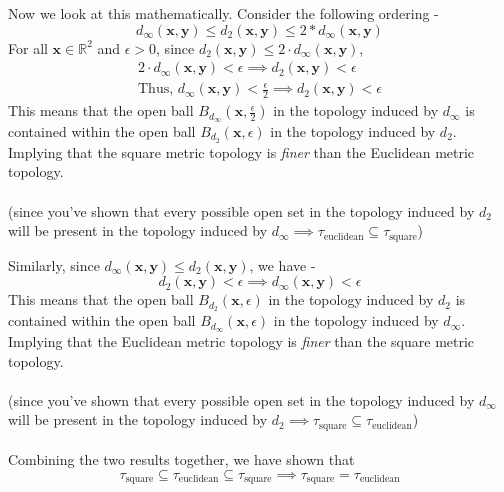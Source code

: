 \begin{frame}
    Now we look at this mathematically. Consider the following ordering -
    \begin{equation*}
        d_\infty(\boldsymbol{x}, \boldsymbol{y}) \leq d_2(\boldsymbol{x}, \boldsymbol{y}) \leq 2*d_\infty(\boldsymbol{x}, \boldsymbol{y})
    \end{equation*}
    \pause
    For all $\boldsymbol{x} \in \mathbb{R}^2$ and $\epsilon > 0$, since $d_2(\boldsymbol{x}, \boldsymbol{y}) \leq 2 \cdot d_\infty(\boldsymbol{x}, \boldsymbol{y})$,
    \begin{gather*}
         2 \cdot d_\infty(\boldsymbol{x}, \boldsymbol{y}) < \epsilon \implies d_2(\boldsymbol{x}, \boldsymbol{y}) < \epsilon \\
         \text{Thus, }d_\infty(\boldsymbol{x}, \boldsymbol{y}) < \frac{\epsilon}{2} \implies d_2(\boldsymbol{x}, \boldsymbol{y}) < \epsilon
    \end{gather*}
    \pause
    This means that the open ball $B_{d_\infty}\left(\boldsymbol{x}, \frac{\epsilon}{2}\right)$ in the topology induced by $d_{\infty}$ is contained within the open ball $B_{d_2}\left(\boldsymbol{x}, \epsilon\right)$ in the topology induced by $d_2$. Implying that the square metric topology is \textit{finer} than the Euclidean metric topology. \\\\
    (since you've shown that every possible open set in the topology induced by $d_2$ will be present in the topology induced by $d_\infty \implies \tau_{\text{euclidean}} \subseteq \tau_{\text{square}}$)
\end{frame}

\begin{frame}
    Similarly, since $d_\infty(\boldsymbol{x}, \boldsymbol{y}) \leq d_2(\boldsymbol{x}, \boldsymbol{y})$, we have -
    \begin{equation*}
        d_2(\boldsymbol{x}, \boldsymbol{y}) < \epsilon \implies d_\infty(\boldsymbol{x}, \boldsymbol{y}) < \epsilon
    \end{equation*}
    \pause
    This means that the open ball $B_{d_2}\left(\boldsymbol{x}, \epsilon\right)$ in the topology induced by $d_2$ is contained within the open ball $B_{d_\infty}\left(\boldsymbol{x}, \epsilon\right)$ in the topology induced by $d_\infty$. Implying that the Euclidean metric topology is \textit{finer} than the square metric topology. \\\\
    (since you've shown that every possible open set in the topology induced by $d_\infty$ will be present in the topology induced by $d_2 \implies \tau_{\text{square}} \subseteq \tau_{\text{euclidean}}$) \\\\
    \pause
    Combining the two results together, we have shown that 
    \begin{equation*}
        \tau_{\text{square}} \subseteq \tau_{\text{euclidean}} \subseteq \tau_{\text{square}} \implies \tau_{\text{square}} = \tau_{\text{euclidean}}
    \end{equation*}
\end{frame}

